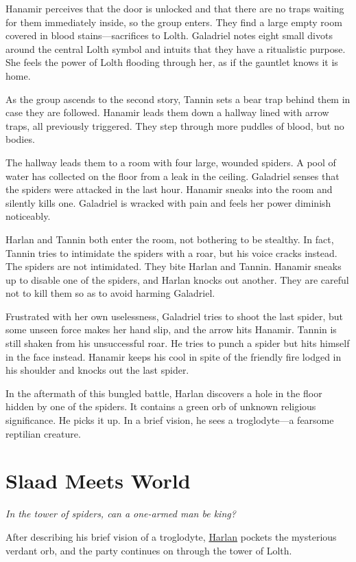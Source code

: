 \documentclass[smalldemyvopaper,11pt,twoside,onecolumn,openright,extrafontsizes]{memoir}
\newcommand{\chapdesc}[1]{
    \begin{flushright}
    \emph{{#1}}
    \end{flushright}
    \vspace{26pt}
}
\begin{document}
Hanamir perceives that the door is unlocked and that there are no traps
waiting for them immediately inside, so the group enters. They find a
large empty room covered in blood stains---sacrifices to Lolth.
Galadriel notes eight small divots around the central Lolth symbol and
intuits that they have a ritualistic purpose. She feels the power of
Lolth flooding through her, as if the gauntlet knows it is home.

As the group ascends to the second story, Tannin sets a bear trap behind
them in case they are followed. Hanamir leads them down a hallway lined
with arrow traps, all previously triggered. They step through more
puddles of blood, but no bodies.

The hallway leads them to a room with four large, wounded spiders. A
pool of water has collected on the floor from a leak in the ceiling.
Galadriel senses that the spiders were attacked in the last hour.
Hanamir sneaks into the room and silently kills one. Galadriel is
wracked with pain and feels her power diminish noticeably.

Harlan and Tannin both enter the room, not bothering to be stealthy. In
fact, Tannin tries to intimidate the spiders with a roar, but his voice
cracks instead. The spiders are not intimidated. They bite Harlan and
Tannin. Hanamir sneaks up to disable one of the spiders, and Harlan
knocks out another. They are careful not to kill them so as to avoid
harming Galadriel.

Frustrated with her own uselessness, Galadriel tries to shoot the last
spider, but some unseen force makes her hand slip, and the arrow hits
Hanamir. Tannin is still shaken from his unsuccessful roar. He tries to
punch a spider but hits himself in the face instead. Hanamir keeps his
cool in spite of the friendly fire lodged in his shoulder and knocks out
the last spider.

In the aftermath of this bungled battle, Harlan discovers a hole in the
floor hidden by one of the spiders. It contains a green orb of unknown
religious significance. He picks it up. In a brief vision, he sees a
troglodyte---a fearsome reptilian creature.


\chapter{Slaad Meets World}
\chapdesc{In the tower of spiders, can a one-armed man be king?}

After describing his brief vision of a troglodyte,
\href{/characters/harlan/}{Harlan} pockets the mysterious verdant orb,
and the party continues on through the tower of Lolth.
\end{document}
